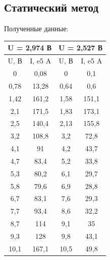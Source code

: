 \documentclass[a4paper, 12pt]{article}
\begin{document}
\subsection*{Статический метод}
Полученные данные:
\begin{table}[H]
	\centering
	\begin{tabular}{|cc|cc|}
	\hline
	\multicolumn{2}{|c|}{\textbf{U   = 2,974 В}} & \multicolumn{2}{c|}{\textbf{U = 2,527 В}} \\ \hline
	\multicolumn{1}{|c|}{U, В}     & I, e5 A     & \multicolumn{1}{c|}{U, В}    & I, e5 A    \\ \hline
	\multicolumn{1}{|c|}{0}        & 0,08        & \multicolumn{1}{c|}{0}       & 0,1        \\ \hline
	\multicolumn{1}{|c|}{0,78}     & 13,28       & \multicolumn{1}{c|}{0,64}    & 0,6        \\ \hline
	\multicolumn{1}{|c|}{1,42}     & 161,2       & \multicolumn{1}{c|}{1,58}    & 151,1      \\ \hline
	\multicolumn{1}{|c|}{2,1}      & 171,5       & \multicolumn{1}{c|}{1,83}    & 173,1      \\ \hline
	\multicolumn{1}{|c|}{2,5}      & 140,4       & \multicolumn{1}{c|}{2,13}    & 155,8      \\ \hline
	\multicolumn{1}{|c|}{3,2}      & 108,8       & \multicolumn{1}{c|}{3,2}     & 72,8       \\ \hline
	\multicolumn{1}{|c|}{4,1}      & 91          & \multicolumn{1}{c|}{4,2}     & 43,7       \\ \hline
	\multicolumn{1}{|c|}{4,7}      & 83,4        & \multicolumn{1}{c|}{5,2}     & 33,8       \\ \hline
	\multicolumn{1}{|c|}{5,3}      & 80,2        & \multicolumn{1}{c|}{6,1}     & 29,7       \\ \hline
	\multicolumn{1}{|c|}{5,8}      & 79,6        & \multicolumn{1}{c|}{6,9}     & 28,8       \\ \hline
	\multicolumn{1}{|c|}{6,7}      & 83,1        & \multicolumn{1}{c|}{7,6}     & 29,3       \\ \hline
	\multicolumn{1}{|c|}{7,7}      & 93,4        & \multicolumn{1}{c|}{8,6}     & 32,2       \\ \hline
	\multicolumn{1}{|c|}{8,7}      & 114         & \multicolumn{1}{c|}{9,1}     & 35         \\ \hline
	\multicolumn{1}{|c|}{9,3}      & 128         & \multicolumn{1}{c|}{9,8}     & 43,1       \\ \hline
	\multicolumn{1}{|c|}{10,1}     & 167,1       & \multicolumn{1}{c|}{10,5}    & 49,8       \\ \hline
	\end{tabular}
	\end{table}
\end{document}
